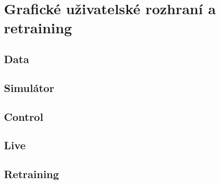 \chapter{Grafické uživatelské rozhraní a retraining}
\section{Data}
\section{Simulátor}
\section{Control}
\section{Live}
\section{Retraining}